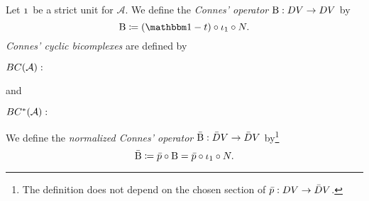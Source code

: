 \documentclass[\MainFolder/Text.tex]{subfiles}
\begin{document}
\begin{Definition}
Let $\NOne$ be a strict unit for $\mathcal{A}$. We define the \emph{Connes' operator} $\mathrm{B}: D V \rightarrow D V$ by 
\begin{equation}\label{Eq:ConnesOperator}
\Cd\coloneqq (\Id-\CycPermOp)\circ\InsOneOp_1\circ\CountOp.
\end{equation}
\emph{Connes' cyclic bicomplexes} are defined by
\begin{center}
$BC(\mathcal{A}):$
\end{center}
and
\begin{center}
$BC^{*}(\mathcal{A}):$
\end{center}
We define the \emph{normalized Connes' operator} $\bar{\mathrm{B}}: \bar{D} V \rightarrow \bar{D} V$ by\footnote{The definition does not depend on the chosen section of $\bar{p}: D V \rightarrow \bar{D} V$.}
\begin{equation}\label{Eq:NCd}
\NCd \coloneqq \NormProj\circ\Cd = \NormProj\circ \InsOneOp_1 \circ \CountOp.

\end{equation}
\end{Definition}
\end{document}
